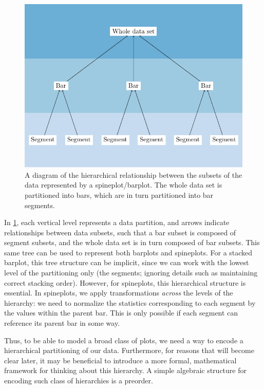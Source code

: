 \documentclass[
]{book}
\theoremstyle{definition}
\theoremstyle{definition}
\theoremstyle{definition}
\theoremstyle{definition}
\theoremstyle{remark}
\begin{document}
\begin{figure}

{\centering \includegraphics[width=1\linewidth,height=1\textheight]{./figures/spineplot-tree} 

}

\caption{A diagram of the hierarchical relationship between the subsets of the data represented by a spineplot/barplot. The whole data set is partitioned into bars, which are in turn partitioned into bar segments.}\label{fig:spineplot-tree}
\end{figure}

In \ref{fig:spineplot-tree}, each vertical level represents a data partition, and arrows indicate relationships between data subsets, such that a bar subset is composed of segment subsets, and the whole data set is in turn composed of bar subsets. This same tree can be used to represent both barplots and spineplots. For a stacked barplot, this tree structure can be implicit, since we can work with the lowest level of the partitioning only (the segments; ignoring details such as maintaining correct stacking order). However, for spineplots, this hierarchical structure is essential. In spineplots, we apply transformations \emph{across} the levels of the hierarchy: we need to normalize the statistics corresponding to each segment by the values within the parent bar. This is only possible if each segment can reference its parent bar in some way.

Thus, to be able to model a broad class of plots, we need a way to encode a hierarchical partitioning of our data. Furthermore, for reasons that will become clear later, it may be beneficial to introduce a more formal, mathematical framework for thinking about this hierarchy. A simple algebraic structure for encoding such class of hierarchies is a preorder.
\end{document}
